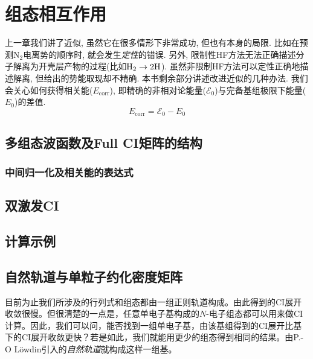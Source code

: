\chapter{组态相互作用}
上一章我们讲了\hft 近似, 虽然它在很多情形下非常成功, 但也有本身的局限. \hft 比如在预测$\text{N}_2$电离势的顺序时, 就会发生\emph{定性}的错误. 另外, 限制性HF方法无法正确描述分子解离为开壳层产物的过程(比如$\mathrm{H}_2\to2\text{H}$). 虽然非限制HF方法可以定性正确地描述解离, 但给出的势能取现却不精确. 本书剩余部分讲述改进\hft 近似的几种办法. 我们会关心如何获得相关能($E_\mathrm{corr}$), 即精确的非相对论能量($\mathscr{E}_0$)与完备基组极限下\hft 能量($E_0$)的差值.
\begin{equation}
E_\mathrm{corr}=\mathscr{E}_0-E_0
\end{equation}
\section{多组态波函数及Full CI矩阵的结构}
\subsection{中间归一化及相关能的表达式}
\section{双激发CI}
\section{计算示例}
\section{自然轨道与单粒子约化密度矩阵}
目前为止我们所涉及的行列式和组态都由一组正则\hft 轨道构成。由此得到的CI展开收敛很慢。但很清楚的一点是，任意单电子基构成的$N$-电子组态都可以用来做CI计算。因此，我们可以问，能否找到一组单电子基，由该基组得到的CI展开比\hft 基下的CI展开收敛更快？若是如此，我们就能用更少的组态得到相同的结果。由P.-O L\"owdin引入的\emph{自然轨道}就构成这样一组基。

